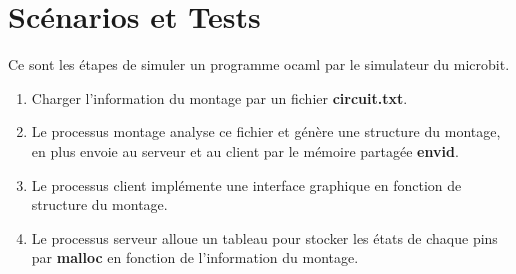 \documentclass[14px]{article}
\begin{document}
	\section{Scénarios et Tests}
	Ce sont les étapes de simuler un programme ocaml par le simulateur du microbit.
	\begin{enumerate}
		\item Charger l'information du montage par un fichier \textbf{circuit.txt}.
		\item Le processus montage analyse ce fichier et génère une structure du montage, en plus envoie au serveur et au client par le mémoire partagée \textbf{envid}.
		\item Le processus client implémente une interface graphique en fonction de structure du montage.
		\item Le processus serveur alloue un tableau pour stocker les états de chaque pins par \textbf{malloc} en fonction de l'information du montage.
		\begin{figure}[htbp]
			\centering
\end{figure}
\end{enumerate}
\end{document}
